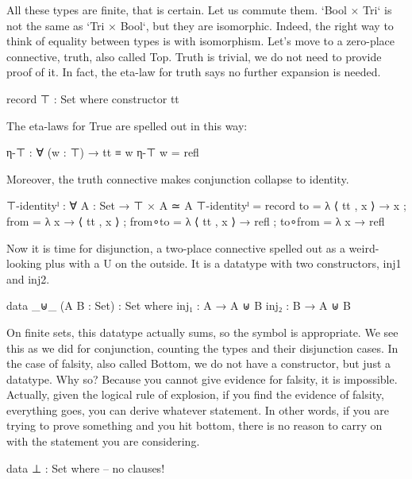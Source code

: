 \documentclass{lecturenotes}
\begin{document}
All these types are finite, that is certain. Let us commute them.
`Bool × Tri` is not the same as `Tri × Bool`, but they are isomorphic. Indeed, the right way to think of equality between types is with isomorphism.
Let's move to a zero-place connective, truth, also called Top. Truth is trivial, we do not need to provide proof of it.
In fact, the eta-law for truth says no further expansion is needed.

\begin{code}
record ⊤ : Set where
constructor tt
\end{code}

The eta-laws for True are spelled out in this way:

\begin{code}
η-⊤ : ∀ (w : ⊤) → tt ≡ w
η-⊤ w = refl
\end{code}

Moreover, the truth connective makes conjunction collapse to identity.

\begin{code}
⊤-identityˡ : ∀ {A : Set} → ⊤ × A ≃ A
⊤-identityˡ =
  record
    { to      = λ{ ⟨ tt , x ⟩ → x }
    ; from    = λ{ x → ⟨ tt , x ⟩ }
    ; from∘to = λ{ ⟨ tt , x ⟩ → refl }
    ; to∘from = λ{ x → refl }
    }
\end{code}

Now it is time for disjunction, a two-place connective spelled out as a weird-looking plus with a U on the outside.
It is a datatype with two constructors, inj1 and inj2. 

\begin{code}
data _⊎_ (A B : Set) : Set where
  inj₁ :  A  → A ⊎ B
  inj₂ : B → A ⊎ B
\end{code}

On finite sets, this datatype actually sums, so the symbol is appropriate.
We see this as we did for conjunction, counting the types and their disjunction cases.
In the case of falsity, also called Bottom, we do not have a constructor, but just a datatype.
Why so? Because you cannot give evidence for falsity, it is impossible.
Actually, given the logical rule of explosion, if you find the evidence of falsity, everything goes, you can derive whatever statement.
In other words, if you are trying to prove something and you hit bottom, there is no reason to carry on with the statement you are considering.

\begin{code}
data ⊥ : Set where
  -- no clauses!
\end{code}
\end{document}
